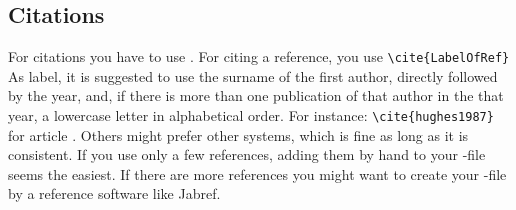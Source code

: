 \subsection{Citations}
\label{sec:cite}

For citations you have to use \BibTeX. For citing a reference, you use
\verb!\cite{LabelOfRef}! As label, it is suggested to use the surname of the
first author, directly followed by the year, and, if there is more than one
publication of that author in the that year, a lowercase letter in
alphabetical order. For instance: \verb!\cite{hughes1987}! for article
\cite{hughes1987}. Others might prefer other systems, which is fine as long
as it is consistent. If you use only a few references, adding them by hand to
your \BibTeX-file seems the easiest. If there are more references you
might want to create your \BibTeX-file by a reference software like Jabref.